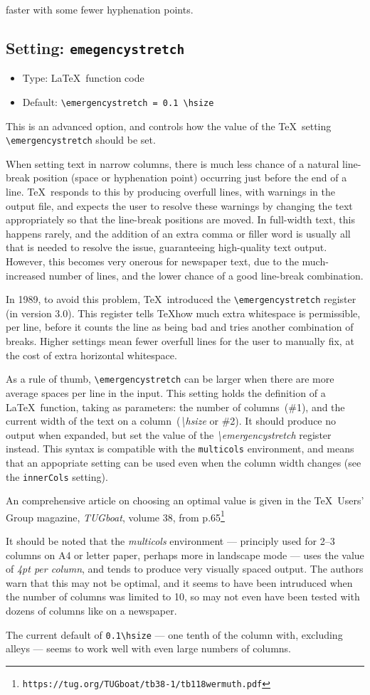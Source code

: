 \documentclass[a4paper,DIV=11]{scrartcl}
\newcommand{\property}[5]{
  \subsection{#1: \texttt{#2}}
  \begin{itemize}
  \item Type: #3
  \item Default: #4
  \end{itemize}
  #5
}
\newcommand{\setting}{\property{Setting}}
\begin{document}
\begin{multicols}{2}
{  faster with some fewer hyphenation points.
}
\setting{emegencystretch}{\LaTeX\ function code}{\texttt{\textbackslash emergencystretch = 0.1 \textbackslash hsize}}{
  This is an advanced option, and controls how the value of the \TeX\ setting
  \texttt{\textbackslash emergencystretch} should be set.\par
  When setting text in narrow columns, there is much less chance of a
  natural line-break position (space or hyphenation point) occurring
  just before the end of a line. \TeX\ responds to this by producing
  overfull lines, with warnings in the output file, and expects the
  user to resolve these warnings by changing the text appropriately so
  that the line-break positions are moved. In full-width text, this
  happens rarely, and the addition of an extra comma or filler word is
  usually all that is needed to resolve the issue, guaranteeing
  high-quality text output. However, this
  becomes very onerous for newspaper text, due to the much-increased
  number of lines, and the lower chance of a good line-break
  combination.\par
  In 1989, to avoid this problem, \TeX\ introduced the
  \texttt{\textbackslash emergencystretch}
  register (in version 3.0). This register tells \TeX how much extra
  whitespace is permissible, per line, before it counts the line as
  being bad and tries another combination of breaks. Higher settings
  mean fewer overfull lines for the user to manually fix, at the cost
  of extra horizontal whitespace.\par
  As a rule of thumb, \texttt{\textbackslash emergencystretch} can be
  larger when there are more average spaces per line in the input.
  This setting holds the definition of a \LaTeX\ function, taking as
  parameters: the number of columns~(\#1), and the current width of
  the text on a column~(\textit{\textbackslash hsize} or \#2). It
  should produce no output when expanded, but set the value of the
  \textit{\textbackslash emergencystretch} register instead. This
  syntax is compatible with the \texttt{multicols} environment, and
  means that an appopriate setting can be used even when the column
  width changes (see the \texttt{innerCols} setting).\par
  An comprehensive article on choosing an optimal value is given in the
  \TeX\ Users' Group magazine, \textit{TUGboat}, volume 38, from p.65\footnote{
  \texttt{https://tug.org/TUGboat/tb38-1/tb118wermuth.pdf}} \par
  It should be noted that the \textit{multicols} environment ---
  principly used for 2--3 columns on A4 or letter paper, perhaps more
  in landscape mode --- uses the value of \textit{4pt per column}, and
  tends to produce very visually spaced output. The authors warn that
  this may not be optimal, and it seems to have been intruduced when
  the number of columns was limited to 10, so may not even have been
  tested with dozens of columns like on a newspaper.
  \par
  The current default of \texttt{0.1\textbackslash hsize} --- one
  tenth of the column with, excluding alleys --- seems to
  work well with even large numbers of columns.
}
\end{multicols}
\end{document}
